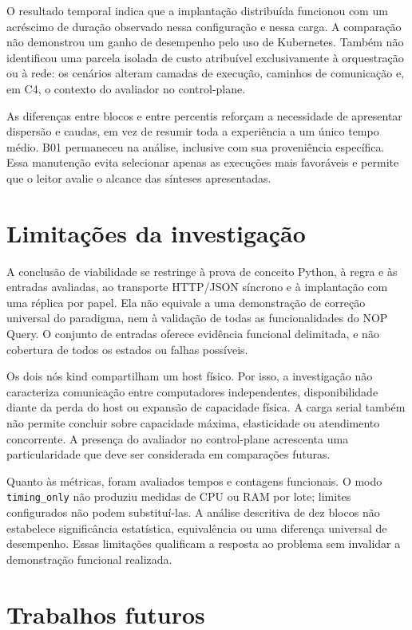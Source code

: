 O resultado temporal indica que a implantação distribuída funcionou com um acréscimo de duração observado nessa configuração e nessa carga. A comparação não demonstrou um ganho de desempenho pelo uso de Kubernetes. Também não identificou uma parcela isolada de custo atribuível exclusivamente à orquestração ou à rede: os cenários alteram camadas de execução, caminhos de comunicação e, em C4, o contexto do avaliador no control-plane.

As diferenças entre blocos e entre percentis reforçam a necessidade de apresentar dispersão e caudas, em vez de resumir toda a experiência a um único tempo médio. B01 permaneceu na análise, inclusive com sua proveniência específica. Essa manutenção evita selecionar apenas as execuções mais favoráveis e permite que o leitor avalie o alcance das sínteses apresentadas.

\section{Limitações da investigação}

A conclusão de viabilidade se restringe à prova de conceito Python, à regra e às entradas avaliadas, ao transporte HTTP/JSON síncrono e à implantação com uma réplica por papel. Ela não equivale a uma demonstração de correção universal do paradigma, nem à validação de todas as funcionalidades do NOP Query. O conjunto de entradas oferece evidência funcional delimitada, e não cobertura de todos os estados ou falhas possíveis.

Os dois nós kind compartilham um host físico. Por isso, a investigação não caracteriza comunicação entre computadores independentes, disponibilidade diante da perda do host ou expansão de capacidade física. A carga serial também não permite concluir sobre capacidade máxima, elasticidade ou atendimento concorrente. A presença do avaliador no control-plane acrescenta uma particularidade que deve ser considerada em comparações futuras.

Quanto às métricas, foram avaliados tempos e contagens funcionais. O modo \texttt{timing\_only} não produziu medidas de CPU ou RAM por lote; limites configurados não podem substituí-las. A análise descritiva de dez blocos não estabelece significância estatística, equivalência ou uma diferença universal de desempenho. Essas limitações qualificam a resposta ao problema sem invalidar a demonstração funcional realizada.

\section{Trabalhos futuros}

